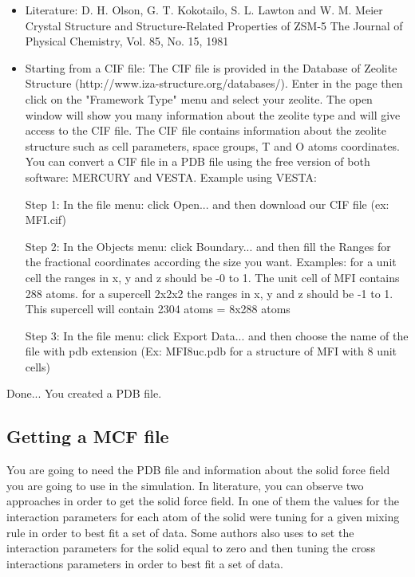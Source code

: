 \begin{itemize}
\item Literature:
D. H. Olson, G. T. Kokotailo, S. L. Lawton and W. M. Meier
Crystal Structure and Structure-Related Properties of ZSM-5
The Journal of Physical Chemistry, Vol. 85, No. 15, 1981

\item Starting from a CIF file:
The CIF file is provided in the Database of Zeolite Structure (http://www.iza-structure.org/databases/).
Enter in the page then click on the "Framework Type" menu and select your zeolite. 
The open window will show you many information about the zeolite type and will give 
access to the CIF file. The CIF file contains information about the zeolite structure 
such as cell parameters, space groups, T and O atoms coordinates. 
You can  convert a CIF file in a PDB file using the free version of both software: MERCURY and VESTA.
Example using VESTA:

Step 1:
In the file menu:
click Open... and then download our CIF file (ex: MFI.cif)

Step 2:
In the Objects menu:
click Boundary... and then fill the Ranges for the fractional coordinates according the size you want.
Examples:
for a unit cell the ranges in x, y and z should be -0 to 1. The unit cell of MFI contains 288 atoms.
for a supercell 2x2x2 the ranges in x, y and z should be -1 to 1. 
This supercell will contain 2304 atoms = 8x288 atoms

Step 3:
In the file menu:
click Export Data... and then choose the name of the file with pdb extension (Ex: MFI8uc.pdb for a structure of MFI with 8 unit cells)

\end{itemize}

Done... You created a PDB file.


\subsection{Getting a MCF file}\label{sec:solid_mcf}
You are going to need the PDB file and information about the solid force field you are going to use in the simulation.
In literature, you can observe two approaches in order to get the solid force field. 
In one of them the values for the interaction parameters for each atom of the solid were 
tuning for a given mixing rule in order to best fit a set of data. 
Some authors also uses to set the interaction parameters for the solid equal to zero and 
then tuning the cross interactions parameters in order to best fit a set of data.

